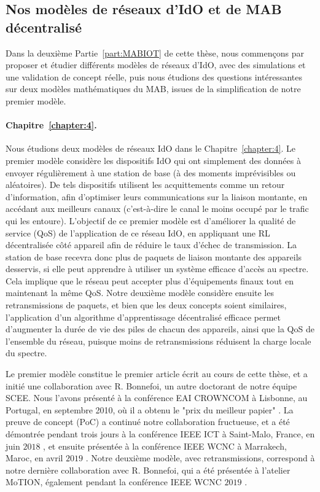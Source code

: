 \begin{resume_fr}

\subsection*{Nos modèles de réseaux d'IdO et de MAB décentralisé}

Dans la deuxième Partie~\ref{part:MABIOT} de cette thèse, nous commençons par proposer et étudier différents modèles de réseaux d'IdO, avec des simulations et une validation de concept réelle, puis nous étudions des questions intéressantes sur deux modèles mathématiques du MAB, issues de la simplification de notre premier modèle.


\paragraph{Chapitre~\ref{chapter:4}.}
%
Nous étudions deux modèles de réseaux IdO dans le Chapitre~\ref{chapter:4}.
Le premier modèle considère les dispositifs IdO qui ont simplement des données à envoyer régulièrement à une station de base (à des moments imprévisibles ou aléatoires).
De tels dispositifs utilisent les acquittements comme un retour d'information, afin d'optimiser leurs communications sur la liaison montante, en accédant aux meilleurs canaux (c'est-à-dire le canal le moins occupé par le trafic qui les entoure).
L'objectif de ce premier modèle est d'améliorer la qualité de service (QoS) de l'application de ce réseau IdO, en appliquant une RL décentralisée côté appareil afin de réduire le taux d'échec de transmission.
La station de base recevra donc plus de paquets de liaison montante des appareils desservis, si elle peut apprendre à utiliser un système efficace d'accès au spectre.
Cela implique que le réseau peut accepter plus d'équipements finaux tout en maintenant la même QoS.
%
Notre deuxième modèle considère ensuite les retransmissions de paquets, et bien que les deux concepts soient similaires, l'application d'un algorithme d'apprentissage décentralisé efficace permet d'augmenter la durée de vie des piles de chacun des appareils, ainsi que la QoS de l'ensemble du réseau, puisque moins de retransmissions réduisent la charge locale du spectre.

Le premier modèle constitue le premier article écrit au cours de cette thèse, et a initié une collaboration avec R. Bonnefoi, un autre doctorant de notre équipe SCEE.
Nous l'avons présenté à la conférence EAI CROWNCOM à Lisbonne, au Portugal, en septembre 2010, où il a obtenu le "prix du meilleur papier" \cite{Bonnefoi17}.
%
La preuve de concept (PoC) a continué notre collaboration fructueuse, et a été démontrée pendant trois jours à la conférence IEEE ICT à Saint-Malo, France, en juin $2018$ \cite{Besson2018ICT}, et ensuite présentée à la conférence IEEE WCNC à Marrakech, Maroc, en avril $2019$ \cite{Besson2019WCNC}.
%
Notre deuxième modèle, avec retransmissions, correspond à notre dernière collaboration avec R. Bonnefoi, qui a été présentée à l'atelier MoTION, également pendant la conférence IEEE WCNC $2019$ \cite{Bonnefoi2019WCNC}.



\end{resume_fr}
